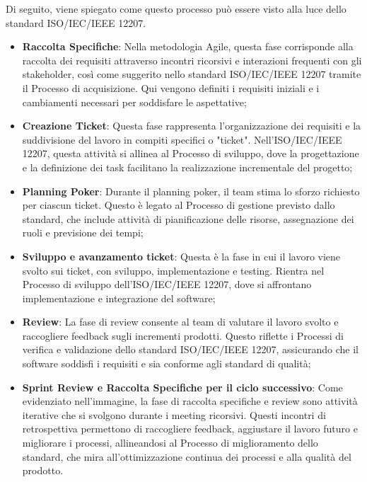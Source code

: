 Di seguito, viene spiegato come questo processo può essere visto alla luce dello standard ISO/IEC/IEEE 12207.
\begin{itemize}
    \item \textbf{Raccolta Specifiche}: Nella metodologia Agile, questa fase corrisponde alla raccolta dei requisiti attraverso incontri ricorsivi e interazioni frequenti con gli stakeholder, così come suggerito nello standard ISO/IEC/IEEE 12207 tramite il Processo di acquisizione. Qui vengono definiti i requisiti iniziali e i cambiamenti necessari per soddisfare le aspettative;
    \item \textbf{Creazione Ticket}: Questa fase rappresenta l'organizzazione dei requisiti e la suddivisione del lavoro in compiti specifici o "ticket". Nell'ISO/IEC/IEEE 12207, questa attività si allinea al Processo di sviluppo, dove la progettazione e la definizione dei task facilitano la realizzazione incrementale del progetto;
    \item \textbf{Planning Poker}: Durante il planning poker, il team stima lo sforzo richiesto per ciascun ticket. Questo è legato al Processo di gestione previsto dallo standard, che include attività di pianificazione delle risorse, assegnazione dei ruoli e previsione dei tempi;
    \item \textbf{Sviluppo e avanzamento ticket}: Questa è la fase in cui il lavoro viene svolto sui ticket, con sviluppo, implementazione e testing. Rientra nel Processo di sviluppo dell'ISO/IEC/IEEE 12207, dove si affrontano implementazione e integrazione del software;
    \item \textbf{Review}: La fase di review consente al team di valutare il lavoro svolto e raccogliere feedback sugli incrementi prodotti. Questo riflette i Processi di verifica e validazione dello standard ISO/IEC/IEEE 12207, assicurando che il software soddisfi i requisiti e sia conforme agli standard di qualità;
    \item \textbf{Sprint Review e Raccolta Specifiche per il ciclo successivo}: Come evidenziato nell'immagine, la fase di raccolta specifiche e review sono attività iterative che si svolgono durante i meeting ricorsivi. Questi incontri di retrospettiva permettono di raccogliere feedback, aggiustare il lavoro futuro e migliorare i processi, allineandosi al Processo di miglioramento dello standard, che mira all'ottimizzazione continua dei processi e alla qualità del prodotto.
\end{itemize}

    
   
    






